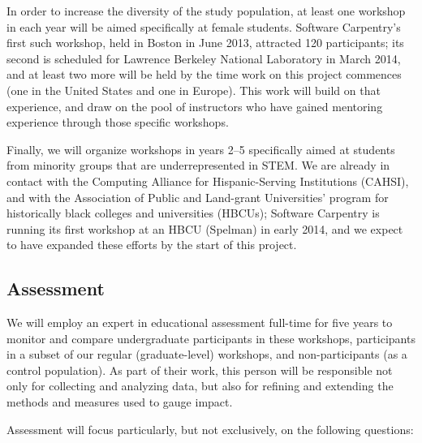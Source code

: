 \documentclass{proposalnsf}
\newlength{\up}
\begin{document}
In order to increase the diversity of the study population, at least
one workshop in each year will be aimed specifically at female
students.  Software Carpentry's first such workshop, held in Boston in
June 2013, attracted 120 participants; its second is scheduled for
Lawrence Berkeley National Laboratory in March 2014, and at least two
more will be held by the time work on this project commences (one in
the United States and one in Europe).  This work will build on that
experience, and draw on the pool of instructors who have gained
mentoring experience through those specific workshops.

Finally, we will organize workshops in years 2--5 specifically aimed
at students from minority groups that are underrepresented in STEM.
We are already in contact with the Computing Alliance for
Hispanic-Serving Institutions (CAHSI), and with the Association of
Public and Land-grant Universities' program for historically black
colleges and universities (HBCUs); Software Carpentry is running its
first workshop at an HBCU (Spelman) in early 2014, and we expect to
have expanded these efforts by the start of this project.

\subsection{Assessment}

We will employ an expert in educational assessment full-time for five
years to monitor and compare undergraduate participants in these
workshops, participants in a subset of our regular (graduate-level)
workshops, and non-participants (as a control population).  As part of
their work, this person will be responsible not only for collecting
and analyzing data, but also for refining and extending the methods
and measures used to gauge impact.

Assessment will focus particularly, but not exclusively, on the
following questions:
\end{document}
